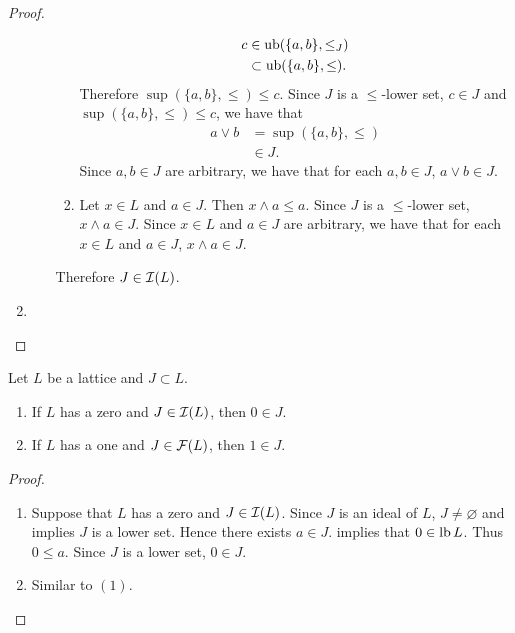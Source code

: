 \documentclass{book}
\begin{document}
\begin{proof}
\begin{enumerate}
\begin{itemize}
\begin{enumerate}
\begin{align}
						c 
						& \in \operatorname{ub}(\{a,b\}, \leq_J) \\
						& \subset \operatorname{ub}(\{a,b\}, \leq).
					\end{align}
					Therefore $\sup(\{a,b\}, \leq) \leq c$. Since $J$ is a $\leq$-lower set, $c \in J$ and $\sup(\{a,b\}, \leq) \leq c$, we have that 
					\begin{align*}
						a \vee b
						& = \sup(\{a,b\}, \leq) \\
						& \in J.
					\end{align*}
					Since $a,b \in J$ are arbitrary, we have that for each $a,b \in J$, $a \vee b \in J$.
					\item Let $x \in L$ and $a \in J$. Then $x \wedge a \leq a$. Since $J$ is a $\leq$-lower set, $x \wedge a \in J$. Since $x \in L$ and $a \in J$ are arbitrary, we have that for each $x \in L$ and $a \in J$, $x \wedge a \in J$.
				\end{enumerate}
				Therefore $J \in \mathcal{I}(L)$.
			\end{itemize}
			\item 
		\end{enumerate}
	\end{proof}
	
	\begin{ex}
		Let $L$ be a lattice and $J \subset L$.
		\begin{enumerate}
			\item If $L$ has a zero and $J \in \mathcal{I}(L)$, then $0 \in J$.
			\item If $L$ has a one and $J \in \mathcal{F}(L)$, then $1 \in J$.
		\end{enumerate} 
	\end{ex}
	
	\begin{proof}\
		\begin{enumerate}
			\item Suppose that $L$ has a zero and $J \in \mathcal{I}(L)$. Since $J$ is an ideal of $L$, $J \neq \varnothing$ and  implies $J$ is a lower set. Hence there exists $a \in J$.  implies that $0 \in \operatorname{lb} L$. Thus $0 \leq a$. Since $J$ is a lower set, $0 \in J$.
			\item Similar to $(1)$.
		\end{enumerate} 
	\end{proof}
	
\end{document}
